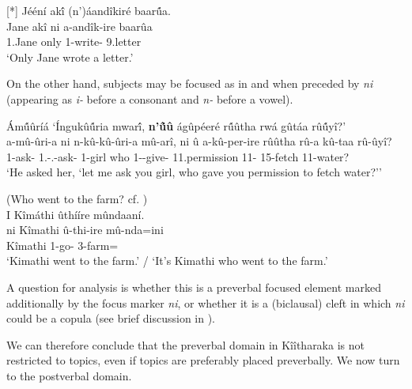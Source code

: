 \documentclass[output=paper]{langscibook}
\begin{document}
\z

\ea
[*]{
Jééní ak\'{î} (n’)áandîkiré baar\'{û}a.\\
\gll
Jane akî  ni  a-andîk-ire baarûa\\
1.Jane only \FOC{} 1\SM{}-write-\PFV{} 9.letter\\
\glt
‘Only Jane wrote a letter.’
}

\z

On the other hand, subjects may be focused as in  and  when preceded by \textit{ni} (appearing as \textit{i-} before a consonant and \textit{n-} before a vowel).

\ea
\label{bkm:Ref94180265}
{Ám\'{û}ûríá} ‘Íngukû\'{û}ria mwar\'{î}, \textbf{n’\'{û}û} ágûpéeré r\'{û}ûtha rwá gûtáa rû\'{û}yî?’\\
\gll
a-mû-ûri-a ni n-kû-kû-ûri-a mû-arî, ni û a-kû-per-ire rûûtha rû-a  kû-taa rû-ûyî?\\
1\OM{}-ask-\FV{}  \FOC{} {1\SG.\SM-\SG.\OM{}-ask-\FV{}} 1-girl \FOC{} who 1\SM-\PRS{}-give-\PFV{} 11.permission 11-\CONN{} 15-fetch 11-water?\\
\glt ‘He asked her, ‘let me ask you girl, who gave you permission to fetch water?’'

\z

\ea
\label{bkm:Ref94180356}
(Who went to the farm? cf. )\\
I Kîmáthi ûthííre mûndaaní.\\
\gll
ni Kîmathi û-thi-ire mû-nda=ini\\
\FOC{} Kîmathi 1\RM{}-go-\PFV{} 3-farm=\LOC{}\\
\glt
‘Kimathi went to the farm.’ / ‘It’s Kimathi who went to the farm.’

\z

A question for analysis is whether this is a preverbal focused element marked additionally by the focus marker \textit{ni}, or whether it is a (biclausal) cleft in which \textit{ni} could be a copula (see brief discussion in ).

We can therefore conclude that the preverbal domain in Kîîtharaka is not restricted to topics, even if topics are preferably placed preverbally. We now turn to the postverbal domain.
\end{document}
